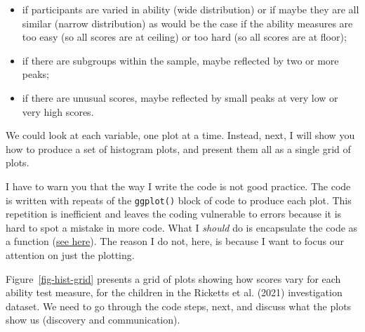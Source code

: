 \documentclass[
  letterpaper,
  DIV=11,
  numbers=noendperiod]{scrreprt}
\providecommand{\tightlist}{%
  \setlength{\itemsep}{0pt}\setlength{\parskip}{0pt}}\usepackage{longtable,booktabs,array}
\begin{document}
\begin{itemize}
\tightlist
\item
  if participants are varied in ability (wide distribution) or if maybe
  they are all similar (narrow distribution) as would be the case if the
  ability measures are too easy (so all scores are at ceiling) or too
  hard (so all scores are at floor);
\item
  if there are subgroups within the sample, maybe reflected by two or
  more peaks;
\item
  if there are unusual scores, maybe reflected by small peaks at very
  low or very high scores.
\end{itemize}

We could look at each variable, one plot at a time. Instead, next, I
will show you how to produce a set of histogram plots, and present them
all as a single grid of plots.

\begin{tcolorbox}[enhanced jigsaw, opacitybacktitle=0.6, title=\textcolor{quarto-callout-warning-color}{\faExclamationTriangle}\hspace{0.5em}{Warning}, arc=.35mm, colbacktitle=quarto-callout-warning-color!10!white, colframe=quarto-callout-warning-color-frame, leftrule=.75mm, opacityback=0, breakable, titlerule=0mm, left=2mm, bottomrule=.15mm, toprule=.15mm, colback=white, coltitle=black, bottomtitle=1mm, toptitle=1mm, rightrule=.15mm]

I have to warn you that the way I write the code is not good practice.
The code is written with repeats of the \texttt{ggplot()} block of code
to produce each plot. This repetition is inefficient and leaves the
coding vulnerable to errors because it is hard to spot a mistake in more
code. What I \emph{should} do is encapsulate the code as a function
(\href{https://r4ds.hadley.nz/functions.html}{see here}). The reason I
do not, here, is because I want to focus our attention on just the
plotting.

\end{tcolorbox}

Figure~\ref{fig-hist-grid} presents a grid of plots showing how scores
vary for each ability test measure, for the children in the Ricketts et
al. (2021) investigation dataset. We need to go through the code steps,
next, and discuss what the plots show us (discovery and communication).
\end{document}
